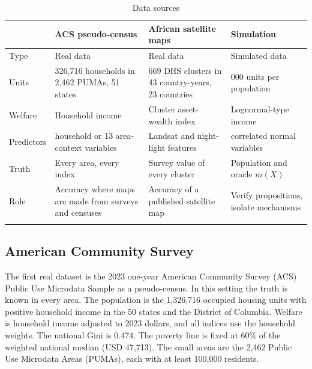 \documentclass[pdflatex,sn-mathphys-ay]{sn-jnl}
\theoremstyle{thmstyleone}%
\theoremstyle{thmstyletwo}%
\theoremstyle{thmstylethree}%
\begin{document}
\begin{table}[ht]
\caption{Data sources}\label{tab:data}%
\small
\begin{tabular*}{\textwidth}{@{\extracolsep\fill}>{\raggedright\arraybackslash}p{}>{\raggedright\arraybackslash}p{}>{\raggedright\arraybackslash}p{}>{\raggedright\arraybackslash}p{}@{}}
\toprule
 & ACS pseudo-census & African satellite maps & Simulation \\
\midrule
Type & Real data & Real data & Simulated data \\
Units & 1{,}326{,}716 households in 2{,}462 PUMAs, 51 states & 19{,}669 DHS clusters in 43 country-years, 23 countries & 100{,}000 units per population \\
Welfare & Household income & Cluster asset-wealth index & Lognormal-type income \\
Predictors & 34 household or 13 area-context variables & 636 Landsat and night-light features & 10 correlated normal variables \\
Truth & Every area, every index & Survey value of every cluster & Population and oracle $m(X)$ \\
Role & Accuracy where maps are made from surveys and censuses & Accuracy of a published satellite map & Verify propositions, isolate mechanisms \\
\botrule
\end{tabular*}
\end{table}

\subsection{American Community Survey}\label{sec:data_acs}

The first real dataset is the 2023 one-year American Community Survey (ACS) Public Use Microdata Sample as a pseudo-census. In this setting the truth is known in every area. The population is the 1{,}326{,}716 occupied housing units with positive household income in the 50 states and the District of Columbia. Welfare is household income adjusted to 2023 dollars, and all indices use the household weights. The national Gini is 0.474. The poverty line is fixed at 60\% of the weighted national median (USD 47{,}713). The small areas are the 2{,}462 Public Use Microdata Areas (PUMAs), each with at least 100{,}000 residents.
\end{document}
